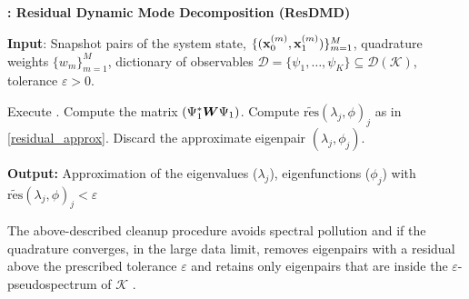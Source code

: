\begin{algorithm}
\caption{\textbf{: Residual Dynamic Mode Decomposition (ResDMD)}}
\label{alg_resdmd}
\textbf{Input}: Snapshot pairs of the system state, $\{(\vb{x}_0^{(m)}, \vb{x}_1^{(m)})\}_{m = 1}^M$, quadrature weights $\{w_m\}_{m = 1}^M$, dictionary of observables $\mathcal{D} = \{\psi_1, \dots, \psi_K\} \subseteq \mathcal{D}(\mathcal{K})$, tolerance $\varepsilon > 0$.
\begin{algorithmic}[1]
\State Execute .
\State Compute the matrix $(\Psi_1^*\vb*{W}\Psi_1)$.
    \State Compute $\widetilde{\mathrm{res}}(\lambda_j, \phi)_j$ as in \eqref{residual_approx}.
        \State Discard the approximate eigenpair $(\lambda_j,\phi_j)$.
    \EndIf
\EndFor
\end{algorithmic}
\textbf{Output:} Approximation of the eigenvalues ($\lambda_j$), eigenfunctions ($\phi_j$) with $\widetilde{\mathrm{res}}(\lambda_j, \phi)_j < \varepsilon$
\end{algorithm}

The above-described cleanup procedure avoids spectral pollution and if the quadrature converges, in the large data limit, removes eigenpairs with a residual above the prescribed tolerance $\varepsilon$ and retains only eigenpairs that are inside the $\varepsilon$-pseudospectrum of $\mathcal{K}$ \cite{colbrook_rigorous_2021}.


